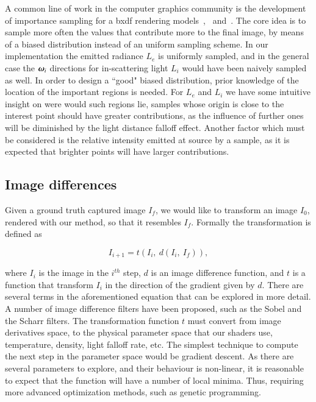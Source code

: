 A common line of work in the computer graphics community is the development of importance sampling for a bxdf rendering models~\cite{Lawrence:2004},~\cite{Ou:2012} and~\cite{Wang:2014}.
The core idea is to sample more often the values that contribute more to the final image, by means of a biased distribution instead of an uniform sampling scheme.
In our implementation the emitted radiance $L_e$ is uniformly sampled, and in the general case the $\boldsymbol{\omega}_i$ directions for in-scattering light $L_i$ would have been naively sampled as well.
In order to design a ``good" biased distribution, prior knowledge of the location of the important regions is needed. 
For $L_e$ and $L_i$ we have some intuitive insight on were would such regions lie, samples whose origin is close to the interest point should have greater contributions, as the influence of further ones will be diminished by the light distance falloff effect.
Another factor which must be considered is the relative intensity emitted at source by a sample, as it is expected that brighter points will have larger contributions. 

\subsection{Image differences}
\label{sec:image_differences}

Given a ground truth captured image $I_f$, we would like to transform an image $I_0$, rendered with our method, so that it resembles $I_f$.
Formally the transformation is defined as

\begin{equation}
I_{i+1} = t(I_i,~d(I_i,~I_f)),
\end{equation}

where $I_i$ is the image in the $i^{th}$ step, $d$ is an image difference function, and $t$ is a function that transform $I_i$ in the direction of the gradient given by $d$.
There are several terms in the aforementioned equation that can be explored in more detail.
A number of image difference filters have been proposed, such as the Sobel and the Scharr filters.
The transformation function $t$ must convert from image derivatives space, to the physical parameter space that our shaders use, temperature, density, light falloff rate, etc.
The simplest technique to compute the next step in the parameter space would be gradient descent.
As there are several parameters to explore, and their behaviour is non-linear, it is reasonable to expect that the function will have a number of local minima. 
Thus, requiring more advanced optimization methods, such as genetic programming.

